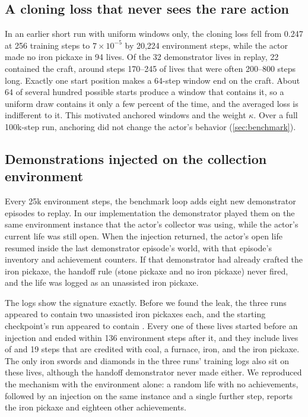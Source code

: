 \subsection{A cloning loss that never sees the rare action}
\label{app:window}

In an earlier short run with uniform windows only, the cloning loss fell from 0.247 at 256 training steps to $7\times10^{-5}$ by 20,224 environment steps, while the actor made no iron pickaxe in 94 lives.
Of the 32 demonstrator lives in replay, 22 contained the craft, around steps 170--245 of lives that were often 200--800 steps long.
Exactly one start position makes a 64-step window end on the craft. About 64 of several hundred possible starts produce a window that contains it, so a uniform draw contains it only a few percent of the time, and the averaged loss is indifferent to it.
This motivated anchored windows and the weight $\kappa$.
Over a full 100k-step run, anchoring did not change the actor's behavior (\cref{sec:benchmark}).

\subsection{Demonstrations injected on the collection environment}
\label{app:inject}

Every 25k environment steps, the benchmark loop adds eight new demonstrator episodes to replay.
In our implementation the demonstrator played them on the same environment instance that the actor's collector was using, while the actor's current life was still open.
When the injection returned, the actor's open life resumed inside the last demonstrator episode's world, with that episode's inventory and achievement counters.
If that demonstrator had already crafted the iron pickaxe, the handoff rule (stone pickaxe and no iron pickaxe) never fired, and the life was logged as an unassisted iron pickaxe.

The logs show the signature exactly.
Before we found the leak, the three runs appeared to contain two unassisted iron pickaxes each, and the starting checkpoint's run appeared to contain \StartSpanningRare{}.
Every one of these lives started before an injection and ended within 136 environment steps after it, and they include lives of \BenchSpanningShortest{} and 19 steps that are credited with coal, a furnace, iron, and the iron pickaxe.
The only iron swords and diamonds in the three runs' training logs also sit on these lives, although the handoff demonstrator never made either.
We reproduced the mechanism with the environment alone: a random life with no achievements, followed by an injection on the same instance and a single further step, reports the iron pickaxe and eighteen other achievements.

